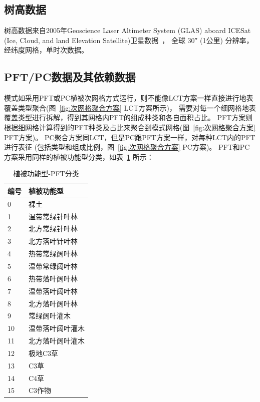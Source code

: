 \subsection{树高数据}\label{树高数据}
树高数据来自2005年Geoscience Laser Altimeter System (GLAS) aboard ICESat 
(Ice, Cloud, and land Elevation Satellite)卫星数据~\citep{simard2011mapping}，
全球 \ang{;;30} (1公里) 分辨率，经纬度网格，单时次数据。

\subsection{PFT/PC数据及其依赖数据}\label{PFTPC数据及其依赖数据}
模式如采用PFT或PC植被次网格方式运行，则不能像LCT方案一样直接进行地表覆盖类型聚合(图~\ref{fig:次网格聚合方案} LCT方案所示)，
需要对每一个细网格地表覆盖类型进行拆解，得到其网格内PFT的组成种类和各自面积占比。
PFT方案则根据细网格计算得到的PFT种类及占比来聚合到模式网格(图~\ref{fig:次网格聚合方案} PFT方案)。
PC聚合方案同LCT，但是PC跟PFT方案一样，对每种LCT内的PFT进行表征 (包括类型和组成比例，图~\ref{fig:次网格聚合方案} PC方案)。
PFT和PC方案采用同样的植被功能型分类，如表~\ref{tab:PFT分类} 所示：
\begin{table}[]
\centering
\caption{植被功能型-PFT分类}
\label{tab:PFT分类}
\begin{tabular}{ll}
\toprule
\multicolumn{1}{l}{编号} & \multicolumn{1}{l}{植被功能型} \\ \midrule
0                      & 裸土                        \\
1                      & 温带常绿针叶林                   \\
2                      & 北方常绿针叶林                   \\
3                      & 北方落叶针叶林                   \\
4                      & 热带常绿阔叶林                   \\
5                      & 温带常绿阔叶林                   \\
6                      & 热带落叶阔叶林                   \\
7                      & 温带落叶阔叶林                   \\
8                      & 北方落叶阔叶林                   \\
9                      & 常绿阔叶灌木                    \\
10                     & 温带落叶阔叶灌木                  \\
11                     & 北方落叶阔叶灌木                  \\
12                     & 极地C3草                     \\
13                     & C3草                       \\
14                     & C4草                       \\
15                     & C3作物                      \\ \bottomrule
\end{tabular}
\end{table}


